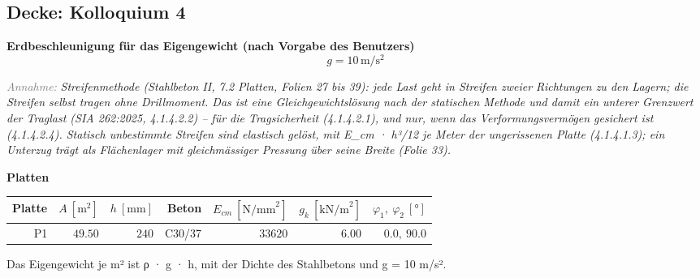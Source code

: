 \documentclass[11pt,a4paper]{article}
\newcommand{\hinweis}[2]{\par\noindent\textcolor{gray}{\textit{#1:}} \textit{#2}\par}
\begin{document}
\subsection{Decke: Kolloquium 4}
\noindent\textbf{Erdbeschleunigung für das Eigengewicht (nach Vorgabe des Benutzers)}
\begin{equation*}
g = 10\,\mathrm{m}/\mathrm{s}^{2}
\end{equation*}
\hinweis{Annahme}{Streifenmethode (Stahlbeton II, 7.2 Platten, Folien 27 bis 39): jede Last geht in Streifen zweier Richtungen zu den Lagern; die Streifen selbst tragen ohne Drillmoment. Das ist eine Gleichgewichtslösung nach der statischen Methode und damit ein unterer Grenzwert der Traglast (SIA 262:2025, 4.1.4.2.2) – für die Tragsicherheit (4.1.4.2.1), und nur, wenn das Verformungsvermögen gesichert ist (4.1.4.2.4). Statisch unbestimmte Streifen sind elastisch gelöst, mit E\_cm · h³/12 je Meter der ungerissenen Platte (4.1.4.1.3); ein Unterzug trägt als Flächenlager mit gleichmässiger Pressung über seine Breite (Folie 33).}
\noindent\textbf{Platten}
\begin{longtable}{rrrrrrr}
\hline
Platte & $A\ [\mathrm{m}^{2}]$ & $h\ [\mathrm{mm}]$ & Beton & $E_{cm}\ [\mathrm{N/mm}^{2}]$ & $g_k\ [\mathrm{kN/m}^{2}]$ & $\varphi_1,\ \varphi_2\ [°]$ \\
\hline
\endhead
P1 & $49.50$ & $240$ & C30/37 & $33620$ & $6.00$ & $0.0,\ 90.0$ \\
\hline
\end{longtable}
Das Eigengewicht je m² ist ρ · g · h, mit der Dichte des Stahlbetons und g = 10 m/s².
\end{document}

